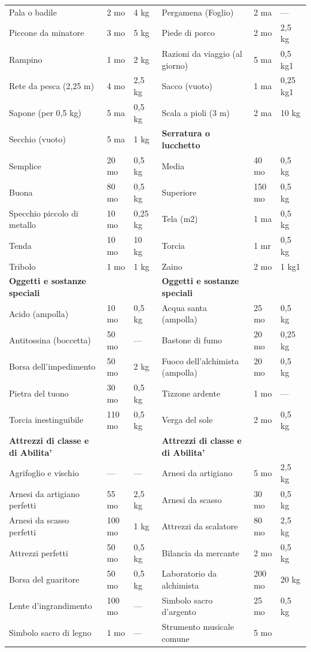 \documentclass[a4paper,11pt,twoside,openany]{dndbook}
\begin{document}
{\begin{longtable}{|L{4cm} |k{1.5cm} |k{1.5cm}|L{5cm} |k{1.5cm} |k{1.5cm}|}
Pala o badile&2 mo&4 kg&	Pergamena (Foglio)&2 ma&—\\
Piccone da minatore&3 mo&5 kg&	Piede di porco&2 mo&2,5 kg\\
Rampino&1 mo&2 kg&	Razioni da viaggio (al giorno)&5 ma&0,5 kg1\\
Rete da pesca (2,25 m)&4 mo&2,5 kg&	Sacco (vuoto)&1 ma&0,25 kg1\\
Sapone (per 0,5 kg)&5 ma&0,5 kg&	Scala a pioli (3 m)&2 ma&10 kg\\
Secchio (vuoto)&5 ma&1 kg&	\textbf{Serratura o lucchetto}&&\\
Semplice&20 mo&0,5 kg&	Media&40 mo&0,5 kg\\
Buona&80 mo&0,5 kg&	Superiore&150 mo&0,5 kg\\
Specchio piccolo di metallo&10 mo&0,25 kg&	Tela (m2)&1 ma&0,5 kg\\
Tenda&10 mo&10 kg&	Torcia&1 mr&0,5 kg\\
Tribolo&1 mo&1 kg&	Zaino&2 mo&1 kg1\\
\textbf{Oggetti e sostanze speciali}&&&	\textbf{Oggetti e sostanze speciali}&&\\
Acido (ampolla)&10 mo&0,5 kg&	Acqua santa (ampolla)&25 mo&0,5 kg\\
Antitossina (boccetta)&50 mo&—&	Bastone di fumo&20 mo&0,25 kg\\
Borsa dell’impedimento&50 mo&2 kg&	Fuoco dell’alchimista (ampolla)&20 mo&0,5 kg\\
Pietra del tuono&30 mo&0,5 kg&	Tizzone ardente&1 mo&—\\
Torcia inestinguibile&110 mo&0,5 kg&	Verga del sole&2 mo&0,5 kg\\
\textbf{Attrezzi di classe e di Abilita'}&&&\textbf{Attrezzi di classe e di Abilita'}&&\\
Agrifoglio e vischio&—&—&	Arnesi da artigiano&5 mo&2,5 kg\\
Arnesi da artigiano perfetti&55 mo&2,5 kg&	Arnesi da scasso&30 mo&0,5 kg\\
Arnesi da scasso perfetti&100 mo&1 kg&	Attrezzi da scalatore&80 mo&2,5 kg\\
Attrezzi perfetti&50 mo&0,5 kg&	Bilancia da mercante&2 mo&0,5 kg\\
Borsa del guaritore&50 mo&0,5 kg&	Laboratorio da alchimista&200 mo&20 kg\\
Lente d’ingrandimento&100 mo&—&	Simbolo sacro d’argento&25 mo&0,5 kg\\
Simbolo sacro di legno&1 mo&—&	Strumento musicale comune&5 mo\\

\end{longtable}}
\end{document}
